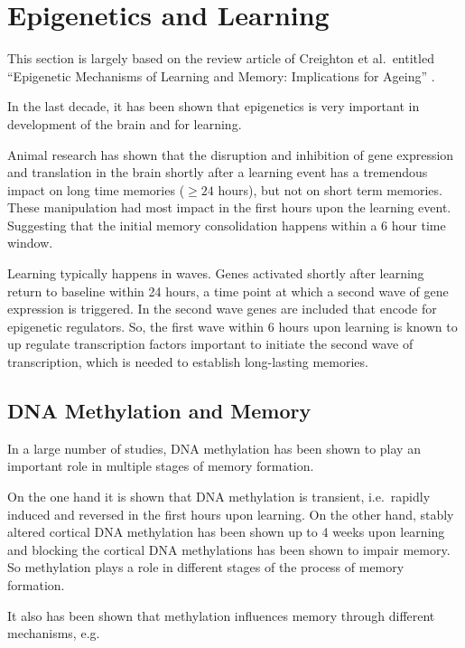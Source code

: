 \documentclass[
  11pt,
]{book}
\begin{document}
\hypertarget{epigenetics-and-learning}{%
\section{Epigenetics and Learning}\label{epigenetics-and-learning}}

This section is largely based on the review article of Creighton et al.~entitled ``Epigenetic Mechanisms of Learning and Memory: Implications for Ageing'' \citep{Creighton2020}.

In the last decade, it has been shown that epigenetics is very important in development of the brain and for learning.

Animal research has shown that the disruption and inhibition of gene expression and translation in the brain shortly after a learning event has a tremendous impact on long time memories (\(\geq 24\) hours), but not on short term memories. These manipulation had most impact in the first hours upon the learning event. Suggesting that the initial memory consolidation happens within a 6 hour time window.

Learning typically happens in waves. Genes activated shortly after learning return to baseline within 24 hours, a time point at which a second wave of gene expression is triggered.
In the second wave genes are included that encode for epigenetic regulators.
So, the first wave within 6 hours upon learning is known to up regulate transcription factors important to initiate the second wave of transcription, which is needed to establish long-lasting memories.

\hypertarget{dna-methylation-and-memory}{%
\subsection{DNA Methylation and Memory}\label{dna-methylation-and-memory}}

In a large number of studies, DNA methylation has been shown to play an important role in multiple stages of memory formation.

On the one hand it is shown that DNA methylation is transient, i.e.~rapidly induced and reversed in the first hours upon learning. On the other hand, stably altered cortical DNA methylation has been shown up to 4 weeks upon learning and blocking the cortical DNA methylations has been shown to impair memory.
So methylation plays a role in different stages of the process of memory formation.

It also has been shown that methylation influences memory through different mechanisms, e.g.~
\end{document}
